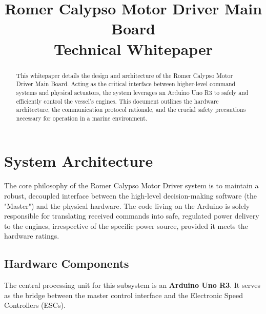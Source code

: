 \documentclass[12pt,a4paper]{article}
\title{\textbf{Romer Calypso Motor Driver Main Board}\\ \Large Technical Whitepaper}
\author{}
\date{}
\begin{document}
\maketitle

\begin{abstract}
This whitepaper details the design and architecture of the Romer Calypso Motor Driver Main Board. Acting as the critical interface between higher-level command systems and physical actuators, the system leverages an Arduino Uno R3 to safely and efficiently control the vessel's engines. This document outlines the hardware architecture, the communication protocol rationale, and the crucial safety precautions necessary for operation in a marine environment.
\end{abstract}

\section{System Architecture}
The core philosophy of the Romer Calypso Motor Driver system is to maintain a robust, decoupled interface between the high-level decision-making software (the "Master") and the physical hardware. The code living on the Arduino is solely responsible for translating received commands into safe, regulated power delivery to the engines, irrespective of the specific power source, provided it meets the hardware ratings.

\subsection{Hardware Components}
The central processing unit for this subsystem is an \textbf{Arduino Uno R3}. It serves as the bridge between the master control interface and the Electronic Speed Controllers (ESCs).
\end{document}
